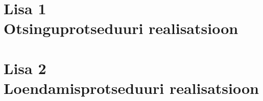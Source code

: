 \documentclass[12pt,estonian]{report}
\begin{document}

\chapter*{Lisa 1\\
	Otsinguprotseduuri realisatsioon}







\onehalfspacing

\chapter*{Lisa 2\\
	Loendamisprotseduuri realisatsioon}


\onehalfspacing
\end{document}
